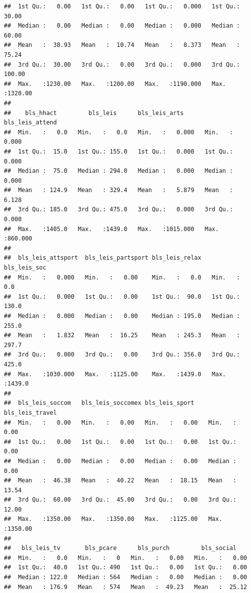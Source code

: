 \documentclass[
]{article}
\begin{document}
\begin{verbatim}
##  1st Qu.:   0.00   1st Qu.:   0.00   1st Qu.:   0.000   1st Qu.:  30.00  
##  Median :   0.00   Median :   0.00   Median :   0.000   Median :  60.00  
##  Mean   :  38.93   Mean   :  10.74   Mean   :   8.373   Mean   :  75.24  
##  3rd Qu.:  30.00   3rd Qu.:   0.00   3rd Qu.:   0.000   3rd Qu.: 100.00  
##  Max.   :1230.00   Max.   :1200.00   Max.   :1190.000   Max.   :1320.00  
##                                                                          
##    bls_hhact         bls_leis      bls_leis_arts      bls_leis_attend  
##  Min.   :   0.0   Min.   :   0.0   Min.   :   0.000   Min.   :  0.000  
##  1st Qu.:  15.0   1st Qu.: 155.0   1st Qu.:   0.000   1st Qu.:  0.000  
##  Median :  75.0   Median : 294.0   Median :   0.000   Median :  0.000  
##  Mean   : 124.9   Mean   : 329.4   Mean   :   5.879   Mean   :  6.128  
##  3rd Qu.: 185.0   3rd Qu.: 475.0   3rd Qu.:   0.000   3rd Qu.:  0.000  
##  Max.   :1405.0   Max.   :1439.0   Max.   :1015.000   Max.   :860.000  
##                                                                        
##  bls_leis_attsport  bls_leis_partsport bls_leis_relax    bls_leis_soc   
##  Min.   :   0.000   Min.   :   0.00    Min.   :   0.0   Min.   :   0.0  
##  1st Qu.:   0.000   1st Qu.:   0.00    1st Qu.:  90.0   1st Qu.: 130.0  
##  Median :   0.000   Median :   0.00    Median : 195.0   Median : 255.0  
##  Mean   :   1.832   Mean   :  16.25    Mean   : 245.3   Mean   : 297.7  
##  3rd Qu.:   0.000   3rd Qu.:   0.00    3rd Qu.: 356.0   3rd Qu.: 425.0  
##  Max.   :1030.000   Max.   :1125.00    Max.   :1439.0   Max.   :1439.0  
##                                                                         
##  bls_leis_soccom   bls_leis_soccomex bls_leis_sport    bls_leis_travel  
##  Min.   :   0.00   Min.   :   0.00   Min.   :   0.00   Min.   :   0.00  
##  1st Qu.:   0.00   1st Qu.:   0.00   1st Qu.:   0.00   1st Qu.:   0.00  
##  Median :   0.00   Median :   0.00   Median :   0.00   Median :   0.00  
##  Mean   :  46.38   Mean   :  40.22   Mean   :  18.15   Mean   :  13.54  
##  3rd Qu.:  60.00   3rd Qu.:  45.00   3rd Qu.:   0.00   3rd Qu.:  12.00  
##  Max.   :1350.00   Max.   :1350.00   Max.   :1125.00   Max.   :1350.00  
##                                                                         
##   bls_leis_tv       bls_pcare      bls_purch         bls_social     
##  Min.   :   0.0   Min.   :   0   Min.   :   0.00   Min.   :   0.00  
##  1st Qu.:  40.0   1st Qu.: 490   1st Qu.:   0.00   1st Qu.:   0.00  
##  Median : 122.0   Median : 564   Median :   0.00   Median :   0.00  
##  Mean   : 176.9   Mean   : 574   Mean   :  49.23   Mean   :  25.12  

\end{verbatim}
\end{document}
